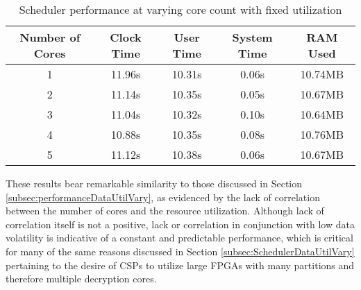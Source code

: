 \begin{table}[ht!]
    \centering\begin{tabular}{| c | c | c | c | c |}
        \hline
        Number of Cores & Clock Time & User Time & System Time & RAM Used \\
        \hline
        1 & 11.96s & 10.31s & 0.06s & 10.74MB \\
        2 & 11.14s & 10.35s & 0.05s & 10.67MB \\
        3 & 11.04s & 10.32s & 0.10s & 10.64MB \\
        4 & 10.88s & 10.35s & 0.08s & 10.76MB \\
        5 & 11.12s & 10.38s & 0.06s & 10.67MB \\
        \hline
    \end{tabular}
    \caption{Scheduler performance at varying core count with fixed utilization}
    \label{table:SchedPerfCoresVary}
\end{table}

These results bear remarkable similarity to those discussed in Section \ref{subsec:performanceDataUtilVary}, as evidenced by the lack of correlation between the number of cores and the resource utilization. Although lack of correlation itself is not a positive, lack or correlation in conjunction with low data volatility is indicative of a constant and predictable performance, which is critical for many of the same reasons discussed in Section \ref{subsec:SchedulerDataUtilVary} pertaining to the desire of CSPs to utilize large FPGAs with many partitions and therefore multiple decryption cores.